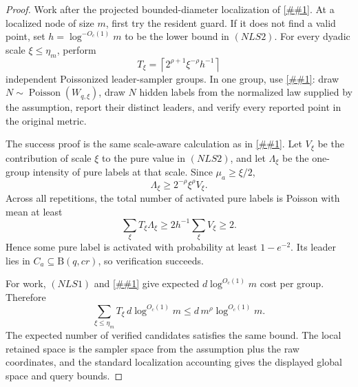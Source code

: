 \documentclass[10pt]{article}
\newcommand{\cref}[1]{\ref{##1}}
\theoremstyle{definition}
\newcommand{\Ball}{\mathrm{B}}
\begin{document}
\begin{proof}
   Work after the projected bounded-diameter localization of
   \cref{lem:localization}.  At a localized node of size \(m\), first try the
   resident guard.  If it does not find a valid point, set
   \(h=\log^{-O_c(1)}m\) to be the lower bound in \((NLS2)\).  For every
   dyadic scale \(\xi\le\eta_m\), perform
   \[
      T_\xi=\left\lceil2^{\rho+1}\xi^{-\rho}h^{-1}\right\rceil
   \]
   independent Poissonized leader-sampler groups.  In one group, use
   \cref{lem:poissonized-normalized-leader-sampler}: draw
   \(N\sim\operatorname{Poisson}(W_{q,\xi})\), draw \(N\) hidden labels from
   the normalized law supplied by the assumption, report their distinct
   leaders, and verify every reported point in the original metric.

   The success proof is the same scale-aware calculation as in
   \cref{lem:dyadic-leader-quotient}.  Let \(V_\xi\) be the contribution of
   scale \(\xi\) to the pure value in \((NLS2)\), and let \(\Lambda_\xi\) be
   the one-group intensity of pure labels at that scale.  Since
   \(\mu_a\ge\xi/2\),
   \[
      \Lambda_\xi\ge2^{-\rho}\xi^\rho V_\xi .
   \]
   Across all repetitions, the total number of activated pure labels is
   Poisson with mean at least
   \[
      \sum_\xi T_\xi\Lambda_\xi
      \ge
      2h^{-1}\sum_\xi V_\xi
      \ge2 .
   \]
   Hence some pure label is activated with probability at least \(1-e^{-2}\).
   Its leader lies in \(C_a\subseteq\Ball(q,cr)\), so verification succeeds.

   For work, \((NLS1)\) and
   \cref{lem:poissonized-normalized-leader-sampler} give expected
   \(d\log^{O_c(1)}m\) cost per group.  Therefore
   \[
      \sum_{\xi\le\eta_m}T_\xi\,d\log^{O_c(1)}m
      \le
      d\,m^\rho\log^{O_c(1)}m .
   \]
   The expected number of verified candidates satisfies the same bound.  The
   local retained space is the sampler space from the assumption plus the raw
   coordinates, and the standard localization accounting gives the displayed
   global space and query bounds.
\end{proof}
\end{document}

